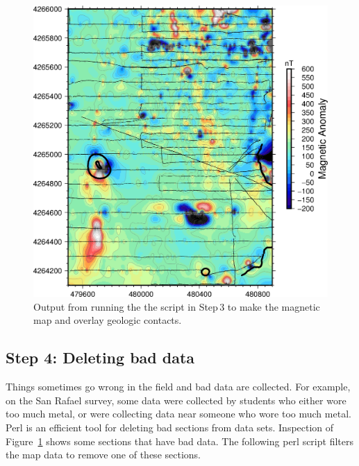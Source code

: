 \documentclass[letterpaper,10pt]{report}
\begin{document}
\begin{figure}
    \centering
    \includegraphics[scale=0.75]{./images/san_raf_mag_map.png}
    \caption{
Output from running the the script in Step\,3 to make the magnetic map and overlay geologic contacts.}
    \label{fig:contour}
\end{figure}


\subsection*{Step 4: Deleting bad data}
Things sometimes go wrong in the field and bad data are collected. For example, on the San Rafael survey, some data were collected by students who either wore too much metal, or were collecting data near someone who wore too much metal. Perl is an efficient tool for deleting bad sections from data sets. Inspection of Figure~\ref{fig:contour} shows some sections that have bad data. The following perl script filters the map data to remove one of these sections.\\
\vspace{3 mm} 
\end{document}
